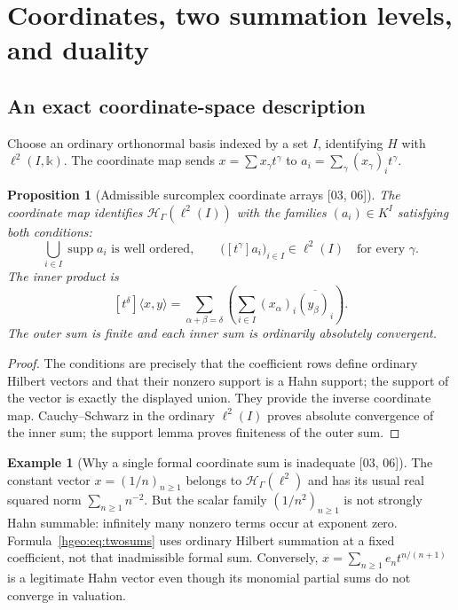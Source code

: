 \documentclass[11pt,letterpaper]{article}
\numberwithin{equation}{section}
\newtheorem{proposition}[proposition]{Proposition}
\theoremstyle{definition}
\newtheorem{example}[example]{Example}
\theoremstyle{remark}
\newcommand{\kk}{\mathbb k}
\newcommand{\K}{K}
\newcommand{\HH}[1]{\mathscr H_\Gamma(#1)}
\newcommand{\supp}{\operatorname{supp}}
\newcommand{\ip}[2]{\langle #1,#2\rangle}
\newcommand{\coeff}[2]{[t^{#1}]#2}
\newcommand{\src}[1]{\textup{\textsf{\small[#1]}}}
\begin{document}
\section{Coordinates, two summation levels, and duality}
\label{hgeo:sec:coordinates}

\subsection{An exact coordinate-space description}
Choose an ordinary orthonormal basis indexed by a set $I$, identifying
$H$ with $\ell^2(I,\kk)$. The coordinate map sends
$x=\sum x_\gamma t^\gamma$ to
$a_i=\sum_\gamma(x_\gamma)_i t^\gamma$.

\begin{proposition}[Admissible surcomplex coordinate arrays
\src{03, 06}]\label{hgeo:prop:coordinates}
The coordinate map identifies $\HH{\ell^2(I)}$ with the families
$(a_i)\in\K^I$ satisfying both conditions:
\[
 \bigcup_{i\in I}\supp a_i\text{ is well ordered},\qquad
 \bigl(\coeff{\gamma}{a_i}\bigr)_{i\in I}\in\ell^2(I)
       \quad\text{for every }\gamma.
\]
The inner product is
\begin{equation}\label{hgeo:eq:twosums}
 [t^\delta]\ip{x}{y}
 =\sum_{\alpha+\beta=\delta}
     \left(\sum_{i\in I}(x_\alpha)_i
                         \overline{(y_\beta)_i}\right).
\end{equation}
The outer sum is finite and each inner sum is ordinarily absolutely
convergent.
\end{proposition}
\begin{proof}
The conditions are precisely that the coefficient rows define ordinary
Hilbert vectors and that their nonzero support is a Hahn support; the
support of the vector is exactly the displayed union.
They provide the inverse coordinate map. Cauchy--Schwarz in the ordinary
$\ell^2(I)$ proves absolute convergence of the inner sum; the support
lemma proves finiteness of the outer sum.
\end{proof}

\begin{example}[Why a single formal coordinate sum is inadequate
\src{03, 06}]
The constant vector $x=(1/n)_{n\ge1}$ belongs to $\HH{\ell^2}$ and has
its usual real squared norm $\sum_{n\ge1}n^{-2}$. But the scalar family
$(1/n^2)_{n\ge1}$ is not strongly Hahn summable: infinitely many nonzero
terms occur at exponent zero. Formula~\eqref{hgeo:eq:twosums} uses ordinary
Hilbert summation at a fixed coefficient, not that inadmissible formal sum.
Conversely, $x=\sum_{n\ge1}e_n t^{n/(n+1)}$ is a legitimate Hahn vector even
though its monomial partial sums do not converge in valuation.
\end{example}
\end{document}
